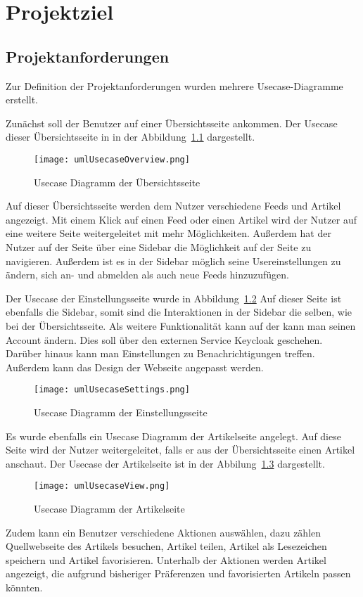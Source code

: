 
\chapter{Projektziel}

\section{Projektanforderungen}
Zur Definition der Projektanforderungen wurden mehrere Usecase-Diagramme erstellt.

Zunächst soll der Benutzer auf einer Übersichtsseite ankommen.
Der Usecase dieser Übersichtsseite in in der Abbildung~\ref{fig:usecaseOverview} dargestellt.
\begin{figure}
    \texttt{[image: umlUsecaseOverview.png]}
    \caption{Usecase Diagramm der Übersichtsseite}
    \label{fig:usecaseOverview}
\end{figure}
Auf dieser Übersichtsseite werden dem Nutzer verschiedene Feeds und Artikel angezeigt. Mit einem Klick auf einen Feed oder einen Artikel wird
der Nutzer auf eine weitere Seite weitergeleitet mit mehr Möglichkeiten. Außerdem hat der Nutzer auf der Seite über eine Sidebar die Möglichkeit
auf der Seite zu navigieren. Außerdem ist es in der Sidebar möglich seine Usereinstellungen zu ändern, sich an- und abmelden als auch neue Feeds
hinzuzufügen. 

Der Usecase der Einstellungsseite wurde in Abbildung~\ref{fig:usecaseSettings}
Auf dieser Seite ist ebenfalls die Sidebar, somit sind die Interaktionen in der Sidebar die selben, wie
bei der Übersichtsseite. Als weitere Funktionalität kann auf der kann man seinen Account
ändern. Dies soll über den externen Service Keycloak geschehen. Darüber hinaus
kann man Einstellungen zu Benachrichtigungen treffen. Außerdem kann das Design der
Webseite angepasst werden.
\begin{figure}
    \texttt{[image: umlUsecaseSettings.png]}
    \caption{Usecase Diagramm der Einstellungsseite}
    \label{fig:usecaseSettings}
\end{figure}


Es wurde ebenfalls ein Usecase Diagramm der Artikelseite angelegt. Auf diese Seite
wird der Nutzer weitergeleitet, falls er aus der Übersichtsseite einen Artikel anschaut.
Der Usecase der Artikelseite ist in der Abbilung~\ref{fig:usecaseView} dargestellt.
\begin{figure}
    \texttt{[image: umlUsecaseView.png]}
    \caption{Usecase Diagramm der Artikelseite}
    \label{fig:usecaseView}
\end{figure}
Zudem kann ein Benutzer verschiedene Aktionen auswählen, dazu zählen Quellwebseite des Artikels besuchen, Artikel teilen, Artikel als 
Lesezeichen speichern und Artikel favorisieren. Unterhalb der Aktionen werden Artikel angezeigt, die aufgrund bisheriger Präferenzen und 
favorisierten Artikeln passen könnten.

